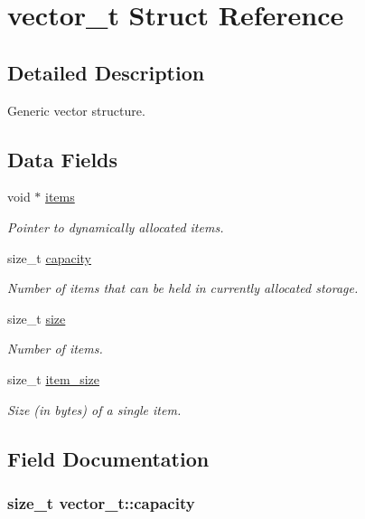 \hypertarget{structvector__t}{
\section{vector\-\_\-t \-Struct \-Reference}
\label{structvector__t}
}


\subsection{\-Detailed \-Description}
\-Generic vector structure. \subsection*{\-Data \-Fields}
\begin{DoxyCompactItemize}
\item 
void $\ast$ \hyperlink{structvector__t_a083c597f2ae3b6302b26ba9e6330ee5f}{items}
\begin{DoxyCompactList}\small\item\em \-Pointer to dynamically allocated items. \end{DoxyCompactList}\item 
size\-\_\-t \hyperlink{structvector__t_a81e18fd00e94087a8f04b657ffc34c04}{capacity}
\begin{DoxyCompactList}\small\item\em \-Number of items that can be held in currently allocated storage. \end{DoxyCompactList}\item 
size\-\_\-t \hyperlink{structvector__t_a7ec97862387465722f8f08f8f8f69371}{size}
\begin{DoxyCompactList}\small\item\em \-Number of items. \end{DoxyCompactList}\item 
size\-\_\-t \hyperlink{structvector__t_a38dfa6c7c9cf7afb483b07cb168461c9}{item\-\_\-size}
\begin{DoxyCompactList}\small\item\em \-Size (in bytes) of a single item. \end{DoxyCompactList}\end{DoxyCompactItemize}


\subsection{\-Field \-Documentation}
\hypertarget{structvector__t_a81e18fd00e94087a8f04b657ffc34c04}{
\subsubsection[{capacity}]{\setlength{\rightskip}{0pt plus 5cm}size\-\_\-t {\bf vector\-\_\-t\-::capacity}}}
\label{structvector__t_a81e18fd00e94087a8f04b657ffc34c04}


